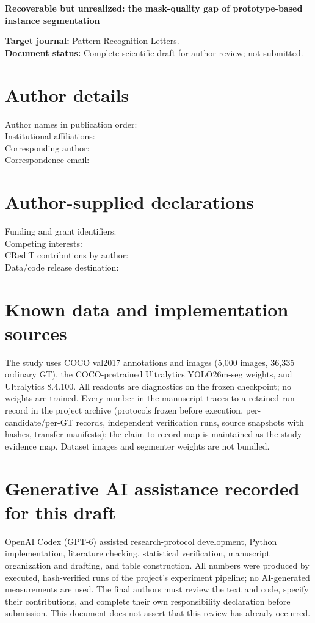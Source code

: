 \documentclass[11pt,a4paper]{article}
\begin{document}
\thispagestyle{empty}
\begin{center}\Large\bfseries
Recoverable but unrealized: the mask-quality gap of prototype-based instance segmentation
\end{center}
\bigskip
\noindent\textbf{Target journal:} Pattern Recognition Letters.\\
\textbf{Document status:} Complete scientific draft for author review; not submitted.

\section*{Author details}
Author names in publication order: \hrulefill\\[1em]
Institutional affiliations: \hrulefill\\[1em]
Corresponding author: \hrulefill\\[1em]
Correspondence email: \hrulefill

\section*{Author-supplied declarations}
Funding and grant identifiers: \hrulefill\\[1em]
Competing interests: \hrulefill\\[1em]
CRediT contributions by author: \hrulefill\\[1em]
Data/code release destination: \hrulefill

\section*{Known data and implementation sources}
The study uses COCO val2017 annotations and images (5{,}000 images, 36{,}335 ordinary GT), the
COCO-pretrained Ultralytics YOLO26m-seg weights, and Ultralytics 8.4.100. All readouts are
diagnostics on the frozen checkpoint; no weights are trained. Every number in the manuscript
traces to a retained run record in the project archive (protocols frozen before execution,
per-candidate/per-GT records, independent verification runs, source snapshots with hashes,
transfer manifests); the claim-to-record map is maintained as the study evidence map. Dataset
images and segmenter weights are not bundled.

\section*{Generative AI assistance recorded for this draft}
OpenAI Codex (GPT-6) assisted research-protocol development, Python implementation, literature
checking, statistical verification, manuscript organization and drafting, and table construction.
All numbers were produced by executed, hash-verified runs of the project's experiment pipeline;
no AI-generated measurements are used. The final authors must review the text and code, specify
their contributions, and complete their own responsibility declaration before submission. This
document does not assert that this review has already occurred.
\end{document}

